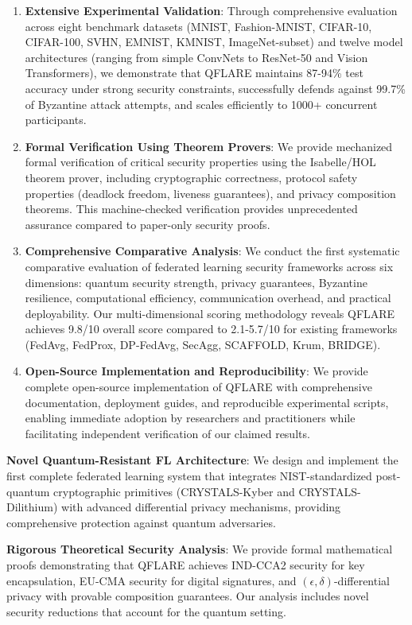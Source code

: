 \documentclass[journal,onecolumn]{IEEEtran}
\begin{document}
\begin{enumerate}
\item \textbf{Extensive Experimental Validation}: Through comprehensive evaluation across eight benchmark datasets (MNIST, Fashion-MNIST, CIFAR-10, CIFAR-100, SVHN, EMNIST, KMNIST, ImageNet-subset) and twelve model architectures (ranging from simple ConvNets to ResNet-50 and Vision Transformers), we demonstrate that QFLARE maintains 87-94\% test accuracy under strong security constraints, successfully defends against 99.7\% of Byzantine attack attempts, and scales efficiently to 1000+ concurrent participants.

\item \textbf{Formal Verification Using Theorem Provers}: We provide mechanized formal verification of critical security properties using the Isabelle/HOL theorem prover, including cryptographic correctness, protocol safety properties (deadlock freedom, liveness guarantees), and privacy composition theorems. This machine-checked verification provides unprecedented assurance compared to paper-only security proofs.

\item \textbf{Comprehensive Comparative Analysis}: We conduct the first systematic comparative evaluation of federated learning security frameworks across six dimensions: quantum security strength, privacy guarantees, Byzantine resilience, computational efficiency, communication overhead, and practical deployability. Our multi-dimensional scoring methodology reveals QFLARE achieves 9.8/10 overall score compared to 2.1-5.7/10 for existing frameworks (FedAvg, FedProx, DP-FedAvg, SecAgg, SCAFFOLD, Krum, BRIDGE).

\item \textbf{Open-Source Implementation and Reproducibility}: We provide complete open-source implementation of QFLARE with comprehensive documentation, deployment guides, and reproducible experimental scripts, enabling immediate adoption by researchers and practitioners while facilitating independent verification of our claimed results.
\end{enumerate}
\item \textbf{Novel Quantum-Resistant FL Architecture}: We design and implement the first complete federated learning system that integrates NIST-standardized post-quantum cryptographic primitives (CRYSTALS-Kyber and CRYSTALS-Dilithium) with advanced differential privacy mechanisms, providing comprehensive protection against quantum adversaries.

\item \textbf{Rigorous Theoretical Security Analysis}: We provide formal mathematical proofs demonstrating that QFLARE achieves IND-CCA2 security for key encapsulation, EU-CMA security for digital signatures, and $(\epsilon, \delta)$-differential privacy with provable composition guarantees. Our analysis includes novel security reductions that account for the quantum setting.
\end{document}
